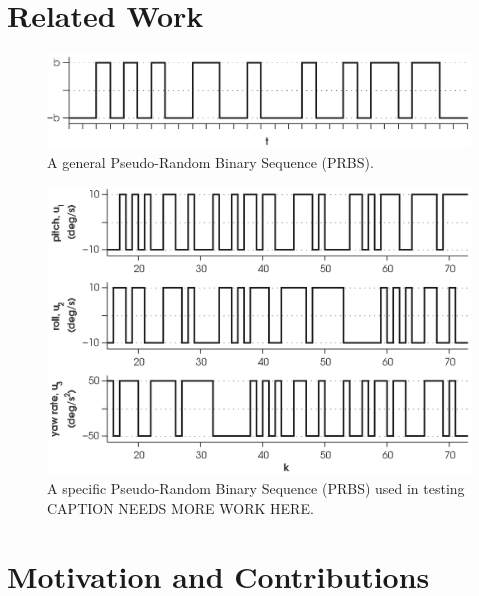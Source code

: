 \section{Related Work}


\begin{figure}[htb!]
	\centering
	\includegraphics{../fig/general_prbs.eps}
	\caption{A general Pseudo-Random Binary Sequence (PRBS).}
\end{figure}

\begin{figure}[htb!]
	\centering
	\includegraphics{../fig/test_prbs.eps}
	\caption{A specific Pseudo-Random Binary Sequence (PRBS) used in testing CAPTION NEEDS MORE WORK HERE.}
\end{figure}

\section{Motivation and Contributions}



